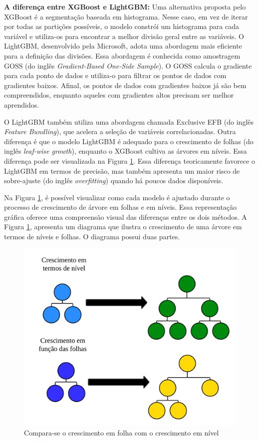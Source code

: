  
 
 \noindent\textbf{A diferen\c ca entre XGBoost e LightGBM:}
 Uma alternativa proposta pelo XGBoost é a segmentação baseada em histograma. Nesse caso, em vez de iterar por todas as partições possíveis, o modelo constrói um histograma para cada variável e utiliza-os para encontrar a melhor divisão geral entre as variáveis.
 O LightGBM, desenvolvido pela Microsoft, adota uma abordagem mais eficiente para a definição das divisões. Essa abordagem é conhecida como amostragem GOSS (do inglês \textit{Gradient-Based One-Side Sample}). O GOSS calcula o gradiente para cada ponto de dados e utiliza-o para filtrar os pontos de dados com gradientes baixos. Afinal, os pontos de dados com gradientes baixos já são bem compreendidos, enquanto aqueles com gradientes altos precisam ser melhor aprendidos.
 
 O LightGBM também utiliza uma abordagem chamada Exclusive EFB (do inglês \textit{Feature Bundling}), que acelera a seleção de variáveis correlacionadas. Outra diferença é que o modelo LightGBM é adequado para o crescimento de folhas (do inglês \textit{leaf-wise growth}), enquanto o XGBoost cultiva as árvores em níveis. Essa diferença pode ser visualizada na Figura \ref{fig:xgboost}.
 Essa diferença teoricamente favorece o LightGBM em termos de precisão, mas também apresenta um maior risco de sobre-ajuste (do inglês \textit{overfitting}) quando há poucos dados disponíveis. 
 
 Na Figura \ref{fig:xgboost}, é possível visualizar como cada modelo é ajustado durante o processo de crescimento de árvore em folhas e em níveis. Essa representação gráfica oferece uma compreensão visual das diferenças entre os dois métodos. A Figura \ref{fig:xgboost}, apresenta um diagrama que ilustra o crescimento de uma árvore em termos de níveis e folhas. O diagrama possui duas partes.
 

 
 \begin{figure}[!htb]
 	\centering
 	\caption{Compara-se o crescimento em folha com o crescimento em nível}
 	\label{fig:xgboost}
 	\includegraphics[width=0.7\linewidth]{Modelos/Figuras/xgboost}
 	
 \end{figure}
 
